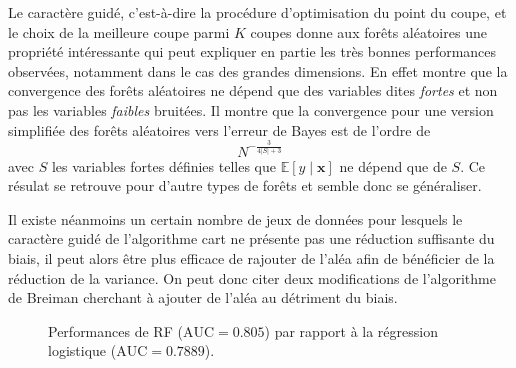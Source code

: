 Le caractère guidé, c'est-à-dire la procédure d'optimisation du point du coupe, et le choix de la meilleure coupe parmi $K$ coupes donne aux forêts aléatoires une propriété intéressante qui peut expliquer en partie les très bonnes performances observées, notamment dans le cas des grandes dimensions. En effet \cite{Breiman2004a} montre que la convergence des forêts aléatoires ne dépend que des variables dites \emph{fortes} et non pas les variables \emph{faibles} bruitées. Il montre que la convergence pour une version simplifiée des forêts aléatoires vers l'erreur de Bayes est de l'ordre de
\begin{equation*}
    N^{- \frac{3}{4 \vert S \vert + 3}}
\end{equation*}
avec $S$ les variables fortes définies telles que $\mathbb{E} \left[ y \mid \mathbf{x} \right]$ ne dépend que de $S$. Ce résulat se retrouve pour d'autre types de forêts \citep{Biau2010a} et semble donc se généraliser.

Il existe néanmoins un certain nombre de jeux de données pour lesquels le caractère guidé de l'algorithme \ac{cart} ne présente pas une réduction suffisante du biais, il peut alors être plus efficace de rajouter de l'aléa afin de bénéficier de la réduction de la variance. On peut donc citer deux modifications de l'algorithme de Breiman cherchant à ajouter de l'aléa au détriment du biais.

\begin{figure}[htbp]
    \caption{Performances de RF ($\mathrm{AUC} = 0.805$) par rapport à la régression logistique ($\mathrm{AUC} = 0.7889$).}
\end{figure}

